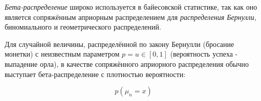 


	
\renewcommand{\figurename}{Рисунок}

\textit{Бета-распределение} широко используется в байесовской статистике, так как оно является сопряжённым априорным распределением для \textit{распределения Бернулли}, биномиального и геометрического распределений.

Для случайной величины, распределённой по закону Бернулли (бросание монетки) с неизвестным параметром $p=u \in [0, 1]$ (вероятность успеха - выпадение орла), в качестве сопряжённого априорного распределения обычно выступает бета-распределение с плотностью вероятности:

\[
p(\mu_n = x)
\] 

 